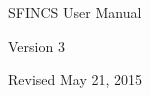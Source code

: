 \begin{center}

\vspace*{2in}

{\Huge SFINCS User Manual}

\vspace{4in}

{\Large Version 3}

\vspace{0.5in}

Revised May 21, 2015

\end{center}

